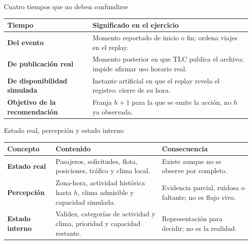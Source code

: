 \documentclass[aspectratio=169,11pt]{beamer}
\begin{document}
\begin{frame}{Cuatro tiempos que no deben confundirse}
  \small
  \begin{tabularx}{\textwidth}{>{\raggedright\arraybackslash\bfseries}p{}X}
    \toprule
    Tiempo & Significado en el ejercicio \\\midrule
    Del evento & Momento reportado de inicio o fin; ordena viajes en el replay. \\
    De publicación real & Momento posterior en que TLC publica el archivo; impide afirmar uso horario real. \\
    De disponibilidad simulada & Instante artificial en que el replay revela el registro: cierre de su hora. \\
    Objetivo de la recomendación & Franja $h+1$ para la que se emite la acción, no $h$ ya observada. \\
    \bottomrule
  \end{tabularx}
\end{frame}

\begin{frame}{Estado real, percepción y estado interno}
  \small
  \begin{tabularx}{\textwidth}{>{\bfseries}p{}X X}
    \toprule
    Concepto & Contenido & Consecuencia \\\midrule
    Estado real & Pasajeros, solicitudes, flota, posiciones, tráfico y clima local. & Existe aunque no se observe por completo. \\
    Percepción & Zona-hora, actividad histórica hasta $h$, clima admisible y capacidad simulada. & Evidencia parcial, ruidosa o faltante; no es flujo vivo. \\
    Estado interno & Validez, categorías de actividad y clima, prioridad y capacidad restante. & Representación para decidir; no es la realidad. \\
    \bottomrule
  \end{tabularx}
\end{frame}
\end{document}
